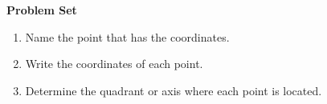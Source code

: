 \textbf{Problem Set}

\vspce

\begin{enumerate}[label = \Alph*. ]
\item Name the point that has the coordinates. 

\begin{enumerate}[label = \arabic*. ]
\end{enumerate}

\item Write the coordinates of each point. 

\begin{enumerate}[label = \arabic*. ]
\end{enumerate} 

\item Determine the  quadrant or axis where each point is located. 

\begin{enumerate}[label = \arabic*. ]
\end{enumerate} 

\end{enumerate} 


% 